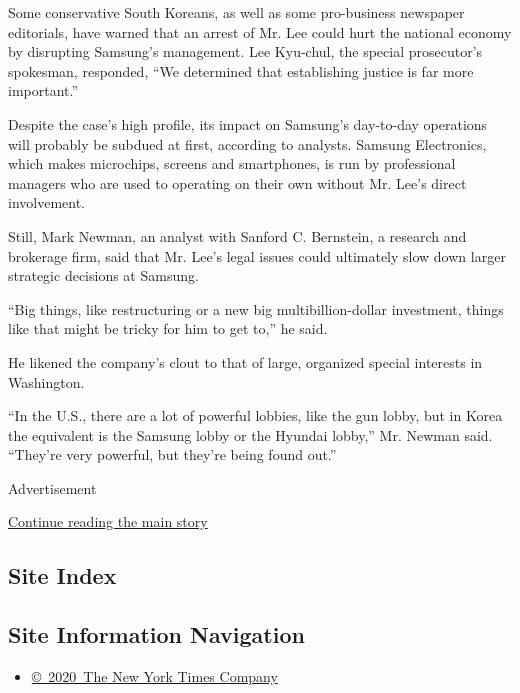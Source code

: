 Some conservative South Koreans, as well as some pro-business newspaper
editorials, have warned that an arrest of Mr. Lee could hurt the
national economy by disrupting Samsung's management. Lee Kyu-chul, the
special prosecutor's spokesman, responded, ``We determined that
establishing justice is far more important.''

Despite the case's high profile, its impact on Samsung's day-to-day
operations will probably be subdued at first, according to analysts.
Samsung Electronics, which makes microchips, screens and smartphones, is
run by professional managers who are used to operating on their own
without Mr. Lee's direct involvement.

Still, Mark Newman, an analyst with Sanford C. Bernstein, a research and
brokerage firm, said that Mr. Lee's legal issues could ultimately slow
down larger strategic decisions at Samsung.

``Big things, like restructuring or a new big multibillion-dollar
investment, things like that might be tricky for him to get to,'' he
said.

He likened the company's clout to that of large, organized special
interests in Washington.

``In the U.S., there are a lot of powerful lobbies, like the gun lobby,
but in Korea the equivalent is the Samsung lobby or the Hyundai lobby,''
Mr. Newman said. ``They're very powerful, but they're being found out.''

Advertisement

\protect\hyperlink{after-bottom}{Continue reading the main story}

\hypertarget{site-index}{%
\subsection{Site Index}\label{site-index}}

\hypertarget{site-information-navigation}{%
\subsection{Site Information
Navigation}\label{site-information-navigation}}

\begin{itemize}
\tightlist
\item
  \href{https://help.nytimes3xbfgragh.onion/hc/en-us/articles/115014792127-Copyright-notice}{©~2020~The
  New York Times Company}
\end{itemize}

